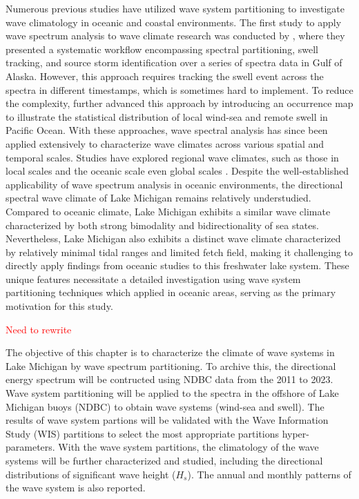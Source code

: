 Numerous previous studies have utilized wave system partitioning to investigate
wave climatology in oceanic and coastal environments. The first study to apply
wave spectrum analysis to wave climate research was conducted by
\citet{hanson_automated_2001}, where they presented a systematic workflow
encompassing spectral partitioning, swell tracking, and source storm
identification over a series of spectra data in Gulf of Alaska. However, this
approach requires tracking the swell event across the spectra in different
timestamps, which is sometimes hard to implement. To reduce the complexity,
\citet{portilla-yandun_wave_2015,portilla-yandun_climate_2016} further advanced
this approach by introducing an occurrence map to illustrate the statistical
distribution of local wind-sea and remote swell in Pacific Ocean. With these
approaches, wave spectral analysis has since been applied extensively to
characterize wave climates across various spatial and temporal scales. Studies
have explored regional wave climates, such as those in local scales
\citep{romano-moreno_multimodal_2023,venolia_historical_2024,zheng_investigation_2024}
and the oceanic scale
\citep{jiang_wave_2019,langodan_unraveling_2018,portilla-yandun_climate_2016}
even global scales \citep{echevarria_seasonal_2019,echevarria_influence_2020}.
Despite the well-established applicability of wave spectrum analysis in oceanic
environments, the directional spectral wave climate of Lake Michigan remains
relatively understudied. Compared to oceanic climate, Lake Michigan exhibits a
similar wave climate characterized by both strong bimodality and
bidirectionality of sea states. Nevertheless, Lake Michigan also exhibits a
distinct wave climate characterized by relatively minimal tidal ranges and
limited fetch field, making it challenging to directly apply findings from
oceanic studies to this freshwater lake system. These unique features
necessitate a detailed investigation using wave system partitioning techniques
which applied in oceanic areas, serving as the primary motivation for this
study.

\textcolor{red}{Need to rewrite}

The objective of this chapter is to characterize the climate of wave systems in
Lake Michigan by wave spectrum partitioning. To archive this, the directional
energy spectrum will be contructed using NDBC data from the 2011 to 2023. Wave
system partitioning will be applied to the spectra in the offshore of Lake
Michigan buoys (NDBC) to obtain wave systems (wind-sea and swell). The results
of wave system partions will be validated with the Wave Information Study (WIS)
partitions to select the most appropriate partitions hyper-parameters. With the
wave system partitions, the climatology of the wave systems will be further
characterized and studied, including the directional distributions of
significant wave height ($H_s$). The annual and monthly patterns of the wave
system is also reported. 
